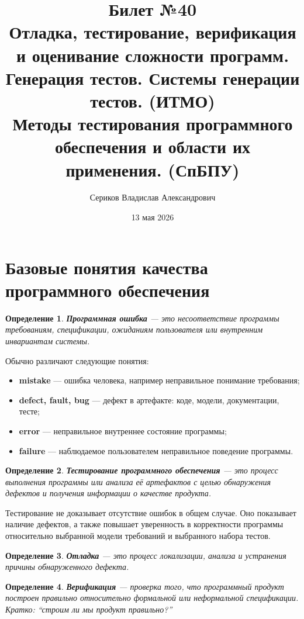 \documentclass[12pt,a4paper]{article}
\title{Билет №40 \\ \small Отладка, тестирование, верификация и оценивание сложности программ. Генерация тестов. Системы генерации тестов. (ИТМО) \\ Методы тестирования программного обеспечения и области их применения. (СпБПУ)}
\author{Сериков Владислав Александрович}
\date{13 мая 2026}
\newtheorem{definition}{Определение}
\begin{document}
\maketitle
\tableofcontents
\newpage

\section{Базовые понятия качества программного обеспечения}

\begin{definition}
\textbf{Программная ошибка} --- это несоответствие программы требованиям, спецификации, ожиданиям пользователя или внутренним инвариантам системы.
\end{definition}

Обычно различают следующие понятия:

\begin{itemize}
    \item \textbf{mistake} --- ошибка человека, например неправильное понимание требования;
    \item \textbf{defect, fault, bug} --- дефект в артефакте: коде, модели, документации, тесте;
    \item \textbf{error} --- неправильное внутреннее состояние программы;
    \item \textbf{failure} --- наблюдаемое пользователем неправильное поведение программы.
\end{itemize}

\begin{definition}
\textbf{Тестирование программного обеспечения} --- это процесс выполнения программы или анализа её артефактов с целью обнаружения дефектов и получения информации о качестве продукта.
\end{definition}

Тестирование не доказывает отсутствие ошибок в общем случае. Оно показывает наличие дефектов, а также повышает уверенность в корректности программы относительно выбранной модели требований и выбранного набора тестов.

\begin{definition}
\textbf{Отладка} --- это процесс локализации, анализа и устранения причины обнаруженного дефекта.
\end{definition}

\begin{definition}
\textbf{Верификация} --- проверка того, что программный продукт построен правильно относительно формальной или неформальной спецификации. Кратко: ``строим ли мы продукт правильно?''
\end{definition}
\end{document}
